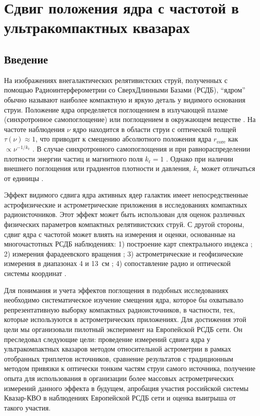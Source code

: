 \chapter{Сдвиг положения ядра с частотой в ультракомпактных квазарах} \label{chapt1}


\section{Введение}
На изображениях внегалактических релятивистских струй, полученных с помощью Радиоинтерферометрии со
СверхДлинными Базами (РСДБ), ``ядром'' обычно называют наиболее компактную и яркую деталь у видимого
основания струи. Положение ядра определяется поглощением в излучающей плазме (синхротронное
самопоглощение) или поглощением в окружающем веществе
\cite{Blandford_Konigl_1979,Konigl_1981,Lobanov_1998}. На частоте наблюдения $\nu$ ядро находится в
области струи с оптической толщей $\tau(\nu) \approx 1$, что приводит к смещению абсолютного
положения ядра $r_\mathrm{core}$ как $\propto \nu^{-1/k_{\mathrm{r}}}$ \cite{Lobanov_1998}. В случае
синхротронного самопоглощения и при равнораспределении плотности энергии частиц и магнитного поля
$k_\mathrm{r} = 1$ \cite{Blandford_Konigl_1979}. Однако при наличии внешнего поглощения или
градиентов плотности и давления, $k_\mathrm{r}$ может отличаться от единицы \cite{Lobanov_1998}.

Эффект видимого сдвига ядра активных ядер галактик имеет непосредственные астрофизические и
астрометрические приложения в исследованиях компактных радиоисточников. Этот эффект может быть
использован для оценок
различных физических параметров компактных релятивистских струй. С другой стороны, сдвиг ядра с
частотой может влиять на измерения и оценки, основанные на многочастотных РСДБ наблюдениях: 1)
построение карт спектрального индекса \cite{Lobanov_1998,Kovalev_2008}; 2) измерения фарадеевского
вращения \cite{Hovatta_2012,Krav2016,Krav2017}; 3) астрометрические и геофизические измерения в
диапазонах 4 и 13~см \cite{Ma_1998,Petrov2009}; 4) сопоставление радио и оптической системы
координат \cite{PK_letter2017,KPP2017,PK2017}.

Для понимания и учета эффектов поглощения в подобных исследованиях необходимо систематическое
изучение смещения ядра, которое бы охватывало репрезентативную выборку компактных радиоисточников, в
частности, тех, которые используются в астрометрических приложениях. Для достижения этой цели мы
организовали пилотный эксперимент на Европейской РСДБ сети. Он преследовал следующие цели:
проведение измерений сдвига ядра у ультракомпактных квазаров методом относительной астрометрии в
рамках отобранных триплетов источников, сравнение результатов с традиционным методом
привязки к оптически тонким частям струи самого источника, получение опыта для использования в
организации более массовых астрометрических измерений данного эффекта в будущем, апробация участия
российской системы Квазар-КВО в наблюдениях Европейской РСДБ сети и оценка выигрыша от такого
участия.

